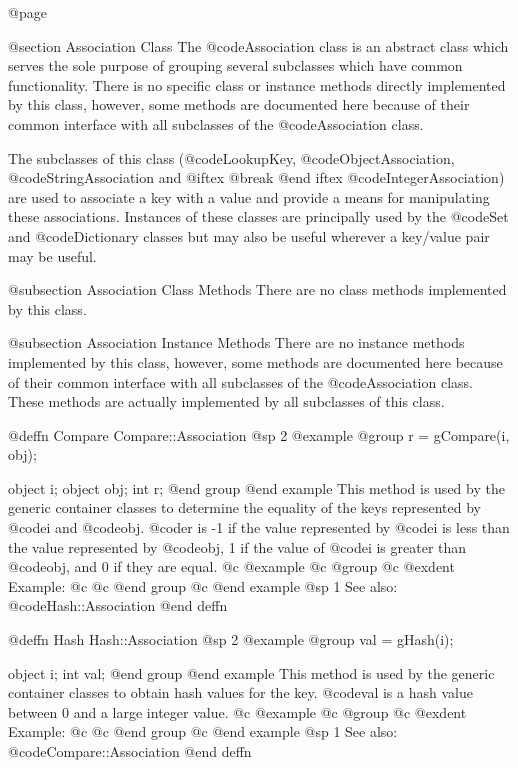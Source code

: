 @page

@section  Association Class
The @code{Association} class is an abstract class which serves the
sole purpose of grouping several subclasses which have common
functionality.  There is no specific class or instance methods
directly implemented by this class, however, some methods are documented
here because of their common interface with all subclasses of the
@code{Association} class.

The subclasses of this class (@code{LookupKey},
@code{ObjectAssociation}, @code{StringAssociation} and
@iftex 
@break 
@end iftex
@code{IntegerAssociation}) are used to associate a key with a value and
provide a means for manipulating these associations.  Instances of these
classes are principally used by the @code{Set} and @code{Dictionary}
classes but may also be useful wherever a key/value pair may be useful.


@subsection Association Class Methods
There are no class methods implemented by this class.


@subsection Association Instance Methods
There are no instance methods implemented by this class, however, some
methods are documented here because of their common interface with all
subclasses of the @code{Association} class.  These methods are actually
implemented by all subclasses of this class.






@deffn {Compare} Compare::Association
@sp 2
@example
@group
r = gCompare(i, obj);

object  i;
object  obj;
int     r;
@end group
@end example
This method is used by the generic container classes to determine
the equality of the keys represented by @code{i} and @code{obj}. 
@code{r} is -1 if the value represented by @code{i} is less than
the value represented by @code{obj}, 1 if the value of @code{i}
is greater than @code{obj}, and 0 if they are equal.
@c @example
@c @group
@c @exdent Example:
@c
@c @end group
@c @end example
@sp 1
See also:  @code{Hash::Association}
@end deffn










@deffn {Hash} Hash::Association
@sp 2
@example
@group
val = gHash(i);

object  i;
int     val;
@end group
@end example
This method is used by the generic container classes to obtain hash
values for the key.  @code{val} is a hash value between 0 and a large
integer value.
@c @example
@c @group
@c @exdent Example:
@c
@c @end group
@c @end example
@sp 1
See also:  @code{Compare::Association}
@end deffn












